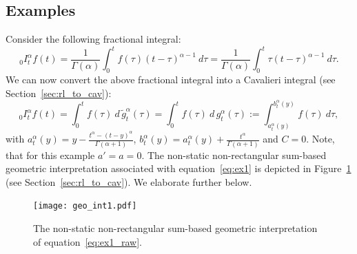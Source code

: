 \documentclass[twoside,reqno,11pt]{fcaa-var} %
\begin{document}
\subsection{Examples}
Consider the following fractional integral:
\begin{equation}
\label{eq:ex1_raw}
_0I_t^{\alpha} f(t) = \frac{1}{\Gamma(\alpha)}\int_0^t f(\tau) (t-\tau)^{\alpha-1}~d\tau = \frac{1}{\Gamma(\alpha)}\int_0^t \tau(t-\tau)^{\alpha-1}~d\tau. 
\end{equation}
We can now convert the above fractional integral into a Cavalieri integral (see Section~\ref{sec:rl_to_cav}):
\begin{equation}
\label{eq:ex1}
_0I_t^{\alpha} f(t) = \int_0^t f(\tau)~d\,\widetilde{g}_t^{\alpha}(\tau)=\int_0^t f(\tau)~d\,g_t^{\alpha}(\tau):=\int_{a_t^{\alpha}(y)}^{b_t^{\alpha}(y)} f(\tau)~d\tau,
\end{equation}
with $a_t^{\alpha}(y) = y - \frac{t^{\alpha}-(t-y)^{\alpha}}{\Gamma(\alpha+1)}$, $b_t^{\alpha}(y) = a_t^{\alpha}(y) + \frac{t^{\alpha}}{\Gamma(\alpha+1)}$ and $C=0$.
Note, that for this example $a'=a=0$. The non-static non-rectangular sum-based geometric interpretation associated with equation~\eqref{eq:ex1} is depicted in Figure~\ref{fig:geo1} (see Section~\ref{sec:rl_to_cav}). We elaborate further below.\\  

\begin{figure}[htb]
\centering
\texttt{[image: geo\_int1.pdf]}
\caption{The non-static non-rectangular sum-based geometric interpretation of equation~\eqref{eq:ex1_raw}.}
\label{fig:geo1}
\end{figure}

\end{document}
